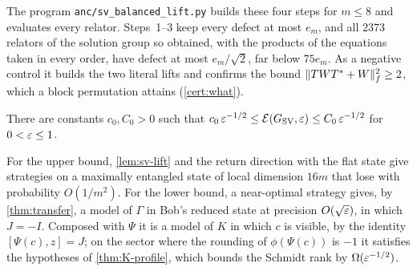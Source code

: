 The program \texttt{anc/sv\_balanced\_lift.py} builds these four steps for $m\le8$ and evaluates every relator. Steps~1--3 keep every defect at
most $e_m$, and all $2373$ relators of the solution group so obtained, with the products of the equations taken in every order, have
defect at most $e_m/\sqrt2$, far below $75e_m$. As a negative control it builds the two literal lifts and confirms the bound
$\lVert TWT^*+W\rVert_f^2\ge2$, which a block permutation attains (\cref{cert:what}).

\begin{theorem}\label{thm:sv-game}
There are constants $c_0,C_0>0$ such that $c_0\,\varepsilon^{-1/2}\le\mathcal E(G_{\mathrm{SV}},\varepsilon)\le C_0\,\varepsilon^{-1/2}$ for $0<\varepsilon\le1$.
\end{theorem}

For the upper bound, \cref{lem:sv-lift} and the return direction with the flat state give strategies on a maximally entangled state of
local dimension $16m$ that lose with probability $O(1/m^2)$. For the lower bound, a near-optimal strategy gives, by \cref{thm:transfer}, a
model of $\Gamma$ in Bob's reduced state at precision $O(\sqrt{\varepsilon})$, in which $J=-I$. Composed with $\Psi$ it is a model of $K$ in which
$c$ is visible, by the identity $[\Psi(c),z]=J$; on the sector where the rounding of $\phi(\Psi(c))$ is $-1$ it satisfies the hypotheses
of \cref{thm:K-profile}, which bounds the Schmidt rank by $\Omega(\varepsilon^{-1/2})$.

